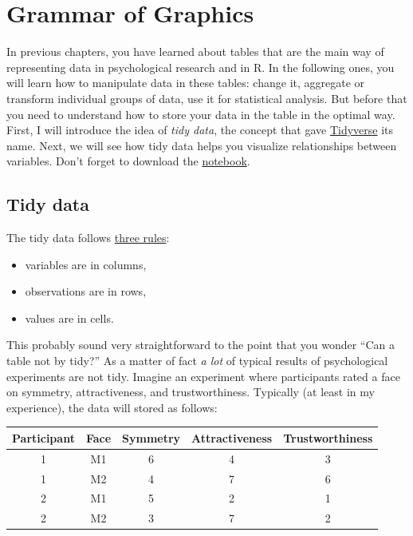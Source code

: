 \documentclass[
]{book}
\providecommand{\tightlist}{%
  \setlength{\itemsep}{0pt}\setlength{\parskip}{0pt}}
\begin{document}
\hypertarget{ggplot2}{%
\chapter{Grammar of Graphics}\label{ggplot2}}

In previous chapters, you have learned about tables that are the main way of representing data in psychological research and in R. In the following ones, you will learn how to manipulate data in these tables: change it, aggregate or transform individual groups of data, use it for statistical analysis. But before that you need to understand how to store your data in the table in the optimal way. First, I will introduce the idea of \emph{tidy data}, the concept that gave \href{https://www.tidyverse.org/}{Tidyverse} its name. Next, we will see how tidy data helps you visualize relationships between variables. Don't forget to download the \href{notebooks/Seminar\%2005\%20-\%20ggplot2.Rmd}{notebook}.

\hypertarget{tidydata}{%
\section{Tidy data}\label{tidydata}}

The tidy data follows \href{https://r4ds.had.co.nz/tidy-data.html}{three rules}:

\begin{itemize}
\tightlist
\item
  variables are in columns,
\item
  observations are in rows,
\item
  values are in cells.
\end{itemize}

This probably sound very straightforward to the point that you wonder ``Can a table not by tidy?'' As a matter of fact \emph{a lot} of typical results of psychological experiments are not tidy. Imagine an experiment where participants rated a face on symmetry, attractiveness, and trustworthiness. Typically (at least in my experience), the data will stored as follows:

\begin{tabular}{c|c|c|c|c}
\hline
Participant & Face & Symmetry & Attractiveness & Trustworthiness\\
\hline
1 & M1 & 6 & 4 & 3\\
\hline
1 & M2 & 4 & 7 & 6\\
\hline
2 & M1 & 5 & 2 & 1\\
\hline
2 & M2 & 3 & 7 & 2\\
\hline
\end{tabular}
\end{document}
